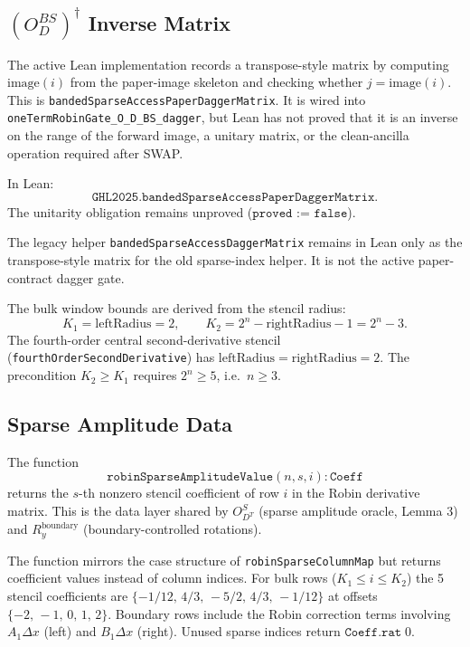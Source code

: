 \subsection{$(O_D^{BS})^\dagger$ Inverse Matrix}

The active Lean implementation records a transpose-style matrix by computing
$\mathrm{image}(i)$ from the paper-image skeleton and checking whether
$j = \mathrm{image}(i)$.  This is
\texttt{bandedSparseAccessPaperDaggerMatrix}.  It is wired into
\texttt{oneTermRobinGate\_O\_D\_BS\_dagger}, but Lean has not proved that it is
an inverse on the range of the forward image, a unitary matrix, or the
clean-ancilla operation required after SWAP.

In Lean:
\[
  \texttt{GHL2025.bandedSparseAccessPaperDaggerMatrix}.
\]
The unitarity obligation remains unproved ($\texttt{proved := false}$).

The legacy helper \texttt{bandedSparseAccessDaggerMatrix} remains in Lean only
as the transpose-style matrix for the old sparse-index helper.  It is not the
active paper-contract dagger gate.

The bulk window bounds are derived from the stencil radius:
\[
  K_1 = \mathrm{leftRadius} = 2, \qquad
  K_2 = 2^n - \mathrm{rightRadius} - 1 = 2^n - 3.
\]
The fourth-order central second-derivative stencil
(\texttt{fourthOrderSecondDerivative}) has $\mathrm{leftRadius} = \mathrm{rightRadius} = 2$.
The precondition $K_2 \geq K_1$ requires $2^n \geq 5$, i.e.\ $n \geq 3$.

\subsection{Sparse Amplitude Data}

The function
\[
  \texttt{robinSparseAmplitudeValue}(n, s, i) : \texttt{Coeff}
\]
returns the $s$-th nonzero stencil coefficient of row $i$ in the Robin
derivative matrix.  This is the data layer shared by $O_{D^T}^{S}$
(sparse amplitude oracle, Lemma 3) and $R_y^{\mathrm{boundary}}$
(boundary-controlled rotations).

The function mirrors the case structure of \texttt{robinSparseColumnMap}
but returns coefficient values instead of column indices.  For bulk rows
($K_1 \leq i \leq K_2$) the 5 stencil coefficients are
$\{-1/12,\, 4/3,\, -5/2,\, 4/3,\, -1/12\}$ at offsets
$\{-2,\,-1,\,0,\,1,\,2\}$.  Boundary rows include the Robin correction
terms involving $A_1\Delta x$ (left) and $B_1\Delta x$ (right).
Unused sparse indices return $\texttt{Coeff.rat}\;0$.

